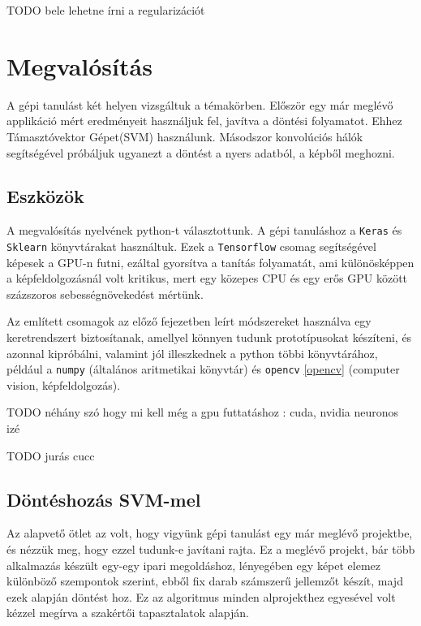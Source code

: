 TODO bele lehetne írni a regularizációt










\newpage
\section{Megvalósítás}

A gépi tanulást két helyen vizsgáltuk a témakörben.
Először egy már meglévő applikáció mért eredményeit használjuk fel,
javítva a döntési folyamatot. Ehhez Támasztóvektor Gépet(SVM) használunk.
Másodszor konvolúciós hálók segítségével próbáljuk ugyanezt a döntést 
a nyers adatból, a képből meghozni. 

\subsection{Eszközök}

A megvalósítás nyelvének python-t választottunk.
A gépi tanuláshoz a \texttt{Keras} \cite{keras} és \texttt{Sklearn} \cite{sklearn} könyvtárakat 
használtuk. Ezek a \texttt{Tensorflow} \cite{tensorflow} csomag segítségével képesek a
GPU-n futni, ezáltal gyorsítva a tanítás folyamatát, ami különösképpen a 
képfeldolgozásnál volt kritikus, mert egy közepes CPU és egy erős GPU között
százszoros sebességnövekedést mértünk.

Az említett csomagok az előző fejezetben leírt módszereket használva egy
keretrendszert biztosítanak, amellyel könnyen tudunk prototípusokat készíteni,
és azonnal kipróbálni, valamint jól illeszkednek a python többi könyvtárához,
például a \texttt{numpy} (általános aritmetikai könyvtár) és \texttt{opencv} \ref{opencv}
(computer vision, képfeldolgozás).



TODO néhány szó hogy mi kell még a gpu futtatáshoz : cuda, nvidia neuronos izé


TODO jurás cucc



\subsection{Döntéshozás SVM-mel}

Az alapvető ötlet az volt, hogy vigyünk gépi tanulást egy már meglévő projektbe,
és nézzük meg, hogy ezzel tudunk-e javítani rajta. Ez a meglévő projekt, bár több 
alkalmazás készült egy-egy ipari megoldáshoz, lényegében egy képet elemez 
különböző szempontok szerint, ebből fix darab számszerű jellemzőt készít, 
majd ezek alapján döntést hoz. Ez az algoritmus minden alprojekthez egyesével
volt kézzel megírva a szakértői tapasztalatok alapján. 


